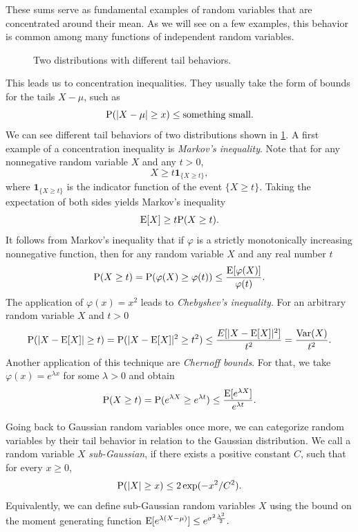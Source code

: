 These sums serve as fundamental examples of random variables that are concentrated around their mean.
As we will see on a few examples, this behavior is common among many functions of independent random variables. 
\begin{figure}[t]
    \centering
    
    \caption{Two distributions with different tail behaviors.}
    \label{fig:tail_distribution_kernels}
\end{figure}
This leads us to concentration inequalities.
They usually take the form of bounds for the tails \(X - \mu\), such as
\[
    \mathrm{P}(\lvert X-\mu \rvert \geq x) \leq \text{something small.}
\]
We can see different tail behaviors of two distributions shown in \cref{fig:tail_distribution_kernels}.
A first example of a concentration inequality is \textit{Markov's inequality}.
Note that for any nonnegative random variable $X$ and any \( t > 0 \), 
\[
    X \geq t \mathbf{1}_{\{X \geq t\}},
\]
where $\mathbf{1}_{\{X \geq t\}}$ is the indicator function of the event $\{X \geq t\}$.
Taking the expectation of both sides yields Markov's inequality
\[
    \operatorname*{E}[X] \geq t \mathrm{P}(X \geq t).
\]
It follows from Markov's inequality that if \( \varphi \) is a strictly monotonically increasing nonnegative function, then for any random variable $X$ and any real number $t$
\[
    \mathrm{P}(X \geq t) = \mathrm{P}( \varphi(X) \geq \varphi(t)) \leq \frac{\operatorname*{E}[\varphi(X)]}{\varphi(t)}.
\]
The application of \( \varphi(x) = x^2 \) leads to \textit{Chebyshev's inequality}. For an arbitrary random variable $X$ and $t>0$
\[
    \mathrm{P}(\lvert X - \operatorname*{E}[X] \rvert \geq t) = \mathrm{P}( \lvert X - \operatorname*{E}[X]\rvert^2 \geq t^2) \leq \frac{E[\lvert X-\operatorname*{E}[X] \rvert^2]}{t^2} = \frac{\operatorname{Var}(X)}{t^2}.
\]
Another application of this technique are \textit{Chernoff bounds}.
For that, we take \( \varphi(x) = e^{\lambda x} \) for some \( \lambda > 0 \) and obtain
\[
    \mathrm{P}(X \geq t) = \mathrm{P}( e^{\lambda X} \geq e^{\lambda t}) \leq \frac{\operatorname*{E}[e^{\lambda X}]}{e^{\lambda t}}.
\]

Going back to Gaussian random variables once more, we can categorize random variables by their tail behavior in relation to the Gaussian distribution.
We call a random variable $X$ \textit{sub-Gaussian}, if there exists a positive constant $C$, such that for every \( x \geq 0 \),
\[
    \mathrm{P}(\lvert X \rvert \geq x) \leq 2 \exp(-x^2/C^2).
\]
Equivalently, we can define sub-Gaussian random variables $X$ using the bound on the moment generating function
\(
    \operatorname*{E}[e^{\lambda(X-\mu)}] \leq e^{\sigma^2 \frac{\lambda^2}{2}}.
\)









